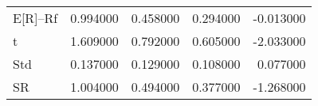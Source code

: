 \begin{tabular}{lrrrr}
\toprule
\midrule
E[R]--Rf & 0.994000 & 0.458000 & 0.294000 & -0.013000 \\
t & 1.609000 & 0.792000 & 0.605000 & -2.033000 \\
Std & 0.137000 & 0.129000 & 0.108000 & 0.077000 \\
SR & 1.004000 & 0.494000 & 0.377000 & -1.268000 \\
\bottomrule
\end{tabular}
